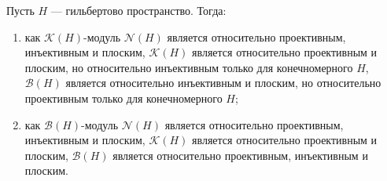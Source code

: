 \begin{proposition}\label{KHAndBHModsRelTh} Пусть $H$ --- гильбертово
пространство. Тогда:

\begin{enumerate}[label = (\roman*)]
    \item как $\mathcal{K}(H)$-модуль $\mathcal{N}(H)$ является относительно
    проективным, инъективным и плоским, $\mathcal{K}(H)$ является относительно
    проективным и плоским, но относительно инъективным только для конечномерного
    $H$, $\mathcal{B}(H)$ является относительно инъективным и плоским, но
    относительно проективным только для конечномерного $H$;

    \item как $\mathcal{B}(H)$-модуль $\mathcal{N}(H)$ является относительно
    проективным, инъективным и плоским, $\mathcal{K}(H)$ является относительно
    проективным и плоским, $\mathcal{B}(H)$ является относительно проективным,
    инъективным и плоским.
\end{enumerate}
\end{proposition}
